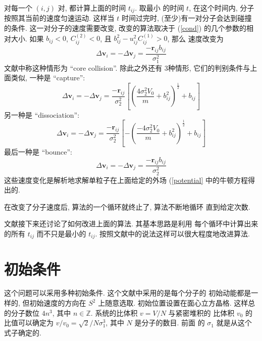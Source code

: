 \documentclass{ctexart}
\def\vec#1{\mathbf{#1}}
\begin{document}
对每一个 $(i,j)$ 对, 都计算上面的时间 $t_{ij}$. 取最小
的时间 $t$, 在这个时间内, 分子按照其当前的速度匀速运动.
这样当 $t$ 时间过完时, (至少)有一对分子会达到碰撞的条件.
这一对分子的速度需要改变, 改变的算法取决于 (\ref{cond})
的几个参数的相对大小. 如果 $b_{ij} < 0$, $C^{(2)}_{ij}
<0$, 且 $b_{ij}^2 -u_{ij}^2C^{(1)}_{ij}>0$, 那么
速度改变为
\[
\Delta \vec v_i = -\Delta \vec v_j = \frac{-\vec
r_{ij}b_{ij}}{\sigma_1^2}
\]
文献中称这种情形为 ``core collision''. 除此之外还有
3种情形, 它们的判别条件与上面类似, 一种是 ``capture'':
\[
\Delta \vec v_i = -\Delta \vec v_j = \frac{-\vec
r_{ij}}{\sigma_2^2}\left[\left(\frac{4\sigma_2^2
V_0}{m}+b^2_{ij}\right)^{\frac{1}{2}}+b_{ij}\right]
\]
另一种是 ``dissociation'':
\[
\Delta \vec v_i = -\Delta \vec v_j = \frac{-\vec
r_{ij}}{\sigma_2^2}\left[-\left(\frac{-4\sigma_2^2
V_0}{m}+b^2_{ij}\right)^{\frac{1}{2}}+b_{ij}\right]
\]
最后一种是 ``bounce'':
\[
\Delta \vec v_i = -\Delta \vec v_j = \frac{-\vec
r_{ij}b_{ij}}{\sigma_2^2}
\]
这些速度变化是解析地求解单粒子在上面给定的外场 (\ref{potential} 中的牛顿方程得出的.

在改变了分子速度后, 算法的一个循环就终止了, 算法不断地循环
直到给定次数.

文献接下来还讨论了如何改进上面的算法. 其基本思路是利用
每个循环中计算出来的所有 $t_{ij}$ 而不只是最小的 $t_{ij}$.
按照文献中的说法这样可以很大程度地改进算法.

\section{初始条件}
这个问题可以采用多种初始条件. 这个文献中采用的是每个分子的
初始动能都是一样的, 但初始速度的方向在 $S^2$ 上随意选取.
初始位置设置在面心立方晶格. 这样总的分子数位 $4n^3$, 其中
$n\in\mathbb{Z}$. 系统的比体积 $v=V/N$ 与紧密堆积的
比体积 $v_0$ 的比值可以确定为 $v/v_0 = \sqrt{2}/N\sigma_1^3$, 其中 $N$ 是分子的数目. 前面
的 $\sigma_1$ 就是从这个式子确定的.
\end{document}
